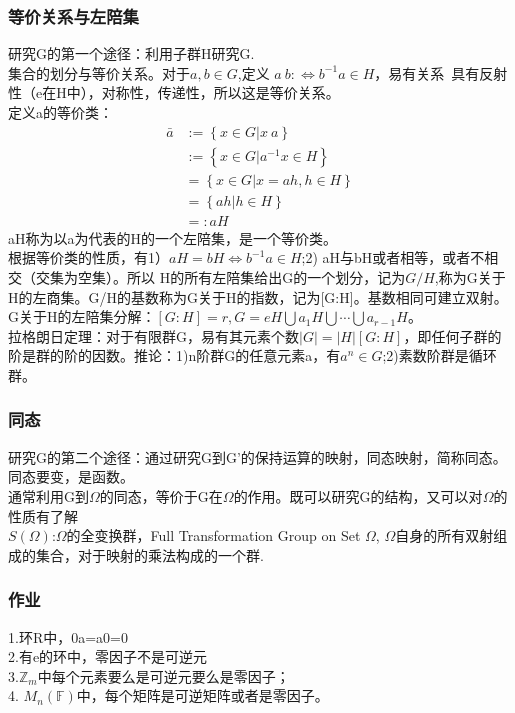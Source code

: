 \subsubsection{等价关系与左陪集}
研究G的第一个途径：利用子群H研究G.\\
集合的划分与等价关系。对于$a,b \in G$,定义 $a~b:\Leftrightarrow b^{-1}a \in H$，易有关系~具有反射性（e在H中），对称性，传递性，所以这是等价关系。\\
定义a的等价类：
\begin{equation}
\begin{split}
\bar a  & :=\left\{ x \in G |x~a \right\}\\
        &:=\left\{ x \in G | a^{-1}x \in H \right\}\\
        &= \left\{ x\in G | x=ah,h\in H \right\}\\
        & =\left\{ ah |h \in H \right\}\\
        &=:aH
\end{split}
\end{equation}
aH称为以a为代表的H的一个左陪集，是一个等价类。\\
根据等价类的性质，有1）$aH=bH \Leftrightarrow b^{-1}a \in H$;2) aH与bH或者相等，或者不相交（交集为空集）。所以 H的所有左陪集给出G的一个划分，记为$G/H$,称为G关于H的左商集。G/H的基数称为G关于H的指数，记为[G:H]。基数相同可建立双射。\\
G关于H的左陪集分解：$[G:H]=r, G=eH \bigcup a_1H \bigcup \cdots \bigcup a_{r-1}H$。\\
拉格朗日定理：对于有限群G，易有其元素个数$|G|=|H|[G:H]$，即任何子群的阶是群的阶的因数。推论：1)n阶群G的任意元素a，有$a^n \in G$;2)素数阶群是循环群。

\subsubsection{同态}
研究G的第二个途径：通过研究G到G'的保持运算的映射，同态映射，简称同态。同态要变，是函数。\\
通常利用G到$\Omega$的同态，等价于G在$\Omega$的作用。既可以研究G的结构，又可以对$\Omega$的性质有了解\\
$S(\Omega)$:$\Omega$的全变换群，Full Transformation Group on Set $\Omega$, $\Omega$自身的所有双射组成的集合，对于映射的乘法构成的一个群.\\

\subsubsection{作业}
1.环R中，0a=a0=0 \\
2.有e的环中，零因子不是可逆元\\
3.$\mathbb Z_m$中每个元素要么是可逆元要么是零因子；\\
4. $M_n(\mathbb F)$中，每个矩阵是可逆矩阵或者是零因子。

